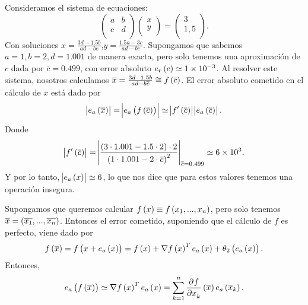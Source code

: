 \begin{example}
      
    Consideramos el sistema de ecuaciones:
    \[
	\begin{pmatrix}
	    a & b\\
	    c & d\\
	\end{pmatrix}
	\begin{pmatrix}
	x\\
	y\\
	\end{pmatrix} =
	\begin{pmatrix}
	3\\
	1,5\\
	\end{pmatrix}.
    \]
    Con soluciones $x = \frac{3d-1.5b}{ad-bc}$,$y = \frac{1.5a-3c}{ad-bc}$. Supongamos que sabemos $a = 1,b = 2,d = 1.001$ de manera exacta, pero solo tenemos una aproximación de $c$ dada por $\overline{c} = 0.499$, con error absoluto $e_r\left( c\right)  \simeq \SI{1e-3}{}$. Al resolver este sistema, nosotros calculamos $\overline{x} = \frac{3d-1.5b}{ad-b\overline{c}} \cong f\left( \overline{c}\right) $. El error absoluto cometido en el cálculo de $\overline{x}$ está dado por
    \[
	    \abs{e_a\left( \overline{x}\right)} = \abs{e_a\left( f\left( \overline{c}\right) \right)} \simeq \abs{f'\left( \overline{c}\right)}\abs{e_a\left( \overline{c}\right)}.
    \]
    Donde
    \[
	    \abs{f'\left( \overline{c}\right)}= \abs{\frac{\left( 3\cdot 1.001-1.5\cdot 2\right) \cdot 2}{\left( 1\cdot 1.001 -2\cdot\overline{c}\right) ^2}}_{\overline{c}=0.499} \simeq \SI{6e3}{}.
    \]
    Y por lo tanto, $\abs{e_a\left( x\right)}\simeq 6$, lo que nos dice que para estos valores tenemos una operación insegura.
\end{example}

\begin{obs}
      Supongamos que queremos calcular $f\left( x\right)  \equiv f\left( x_1,...,x_n\right) $, pero solo tenemos $\overline{x} = \left( \overline{x_1},...,\overline{x_n}\right) $. Entonces el error cometido, suponiendo que el cálculo de $f$ es perfecto, viene dado por
      \[
	      f\left( \overline{x}\right)  = f\left( x + e_a\left( x\right) \right)  = f\left( x\right)  + \nabla f\left( x\right)^Te_a\left( x\right)  + \theta_2\left( e_a\left( x\right) \right).
      \]
      Entonces,
      \[
	      e_a\left( f\left( \overline{x}\right) \right)  \simeq \nabla f\left( x\right) ^Te_a\left( x\right)  = \sum_{k=1}^{n}\frac{\partial^{} f}{\partial x_k^{}} \left( \overline{x}\right) e_a\left( \overline{x}_k\right).
      \]
\end{obs}


